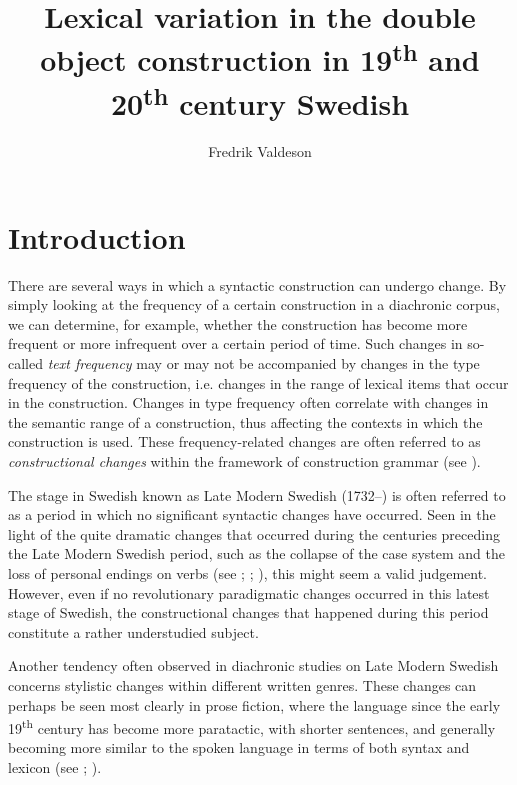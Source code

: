 \documentclass[output=paper]{langscibook}
\author{Fredrik Valdeson\orcid{}\affiliation{Stockholm University}}
\title[Lexical variation in double objects in 19\textsuperscript{th} and 20\textsuperscript{th} c. Swedish]
      {Lexical variation in the double object construction in 19\textsuperscript{th} and 20\textsuperscript{th} century Swedish}
\begin{document}
\maketitle 


\section{Introduction}\label{sec:valdeson:1}\largerpage


There are several ways in which a syntactic construction can undergo change. By simply looking at the frequency of a certain construction in a diachronic corpus, we can determine, for example, whether the construction has become more frequent or more infrequent over a certain period of time. Such changes in so-called \textit{text frequency} may or may not be accompanied by changes in the type frequency of the construction, i.e. changes in the range of lexical items that occur in the construction. Changes in type frequency often correlate with changes in the semantic range of a construction, thus affecting the contexts in which the construction is used. These frequency-related changes are often referred to as \textit{constructional changes} within the framework of construction grammar (see \citealt{Hilpert2013}).



The stage in Swedish known as Late Modern Swedish (1732–) is often referred to as a period in which no significant syntactic changes have occurred. Seen in the light of the quite dramatic changes that occurred during the centuries preceding the Late Modern Swedish period, such as the collapse of the case system and the loss of personal endings on verbs (see \citealt{Delsing2014Studier}; \citealt[1130--1132]{Mørck2005Nordic}; \citealt[1276]{Larsson2005}), this might seem a valid judgement. However, even if no revolutionary paradigmatic changes occurred in this latest stage of Swedish, the constructional changes that happened during this period constitute a rather understudied subject.



Another tendency often observed in diachronic studies on Late Modern Swedish concerns stylistic changes within different written genres. These changes can perhaps be seen most clearly in prose fiction, where the language since the early 19\textsuperscript{th} century has become more paratactic, with shorter sentences, and generally becoming more similar to the spoken language in terms of both syntax and lexicon (see \citealt{Johannisson1971}; \citealt[129–130]{Thelander2011}).
\end{document}
